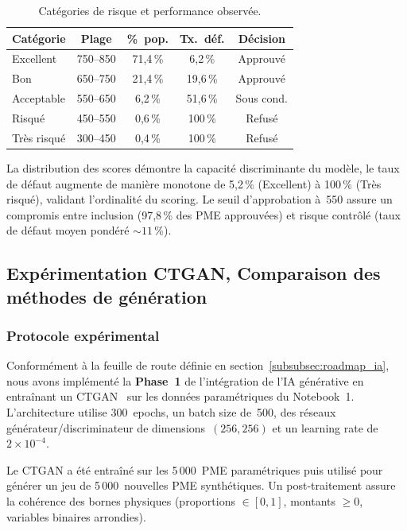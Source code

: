 \documentclass[12pt, a4paper, twocolumn]{article}
\begin{document}
\begin{table}[htbp]
\centering
\caption{Catégories de risque et performance observée.}
\label{tab:categories_risque}
\small
\begin{tabularx}{\columnwidth}{@{}lcccc@{}}
\toprule
\textbf{Catégorie} & \textbf{Plage} & \textbf{\%~pop.} & \textbf{Tx.~déf.} & \textbf{Décision} \\
\midrule
Excellent & 750--850 & 71,4\,\% & 6,2\,\% & Approuvé \\
Bon & 650--750 & 21,4\,\% & 19,6\,\% & Approuvé \\
Acceptable & 550--650 & 6,2\,\% & 51,6\,\% & Sous cond. \\
Risqué & 450--550 & 0,6\,\% & 100\,\% & Refusé \\
Très risqué & 300--450 & 0,4\,\% & 100\,\% & Refusé \\
\bottomrule
\end{tabularx}
\end{table}

La distribution des scores démontre la capacité discriminante du modèle, le taux de défaut augmente de manière monotone de 5,2\,\% (Excellent) à 100\,\% (Très risqué), validant l'ordinalité du scoring. Le seuil d'approbation à~550 assure un compromis entre inclusion (97,8\,\% des PME approuvées) et risque contrôlé (taux de défaut moyen pondéré ${\sim}11\,\%$).

\subsection{Expérimentation CTGAN, Comparaison des méthodes de génération}
\label{subsec:ctgan}

\subsubsection{Protocole expérimental}

Conformément à la feuille de route définie en section~\ref{subsubsec:roadmap_ia}, nous avons implémenté la \textbf{Phase~1} de l'intégration de l'IA générative en entraînant un CTGAN~\cite{xu2019ctgan} sur les données paramétriques du Notebook~1. L'architecture utilise 300~epochs, un batch size de~500, des réseaux générateur/discriminateur de dimensions~$(256, 256)$ et un learning rate de $2 \times 10^{-4}$.

Le CTGAN a été entraîné sur les 5\,000~PME paramétriques puis utilisé pour générer un jeu de 5\,000~nouvelles PME synthétiques. Un post-traitement assure la cohérence des bornes physiques (proportions $\in [0, 1]$, montants $\geq 0$, variables binaires arrondies).
\end{document}
